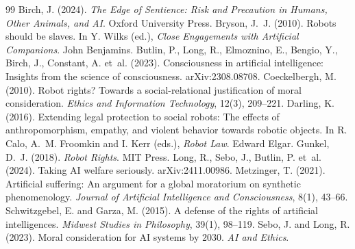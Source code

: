 \documentclass{situationist-preprint}
\begin{document}
\begin{thebibliography}{99}\small
{} Birch, J. (2024). \emph{The Edge of Sentience: Risk and Precaution in Humans, Other Animals, and AI}. Oxford University Press.
 Bryson, J.~J. (2010). Robots should be slaves. In Y. Wilks (ed.), \emph{Close Engagements with Artificial Companions}. John Benjamins.
 Butlin, P., Long, R., Elmoznino, E., Bengio, Y., Birch, J., Constant, A. et~al. (2023). Consciousness in artificial intelligence: Insights from the science of consciousness. arXiv:2308.08708.
 Coeckelbergh, M. (2010). Robot rights? Towards a social-relational justification of moral consideration. \emph{Ethics and Information Technology}, 12(3), 209--221.
 Darling, K. (2016). Extending legal protection to social robots: The effects of anthropomorphism, empathy, and violent behavior towards robotic objects. In R. Calo, A.~M. Froomkin and I. Kerr (eds.), \emph{Robot Law}. Edward Elgar.
 Gunkel, D.~J. (2018). \emph{Robot Rights}. MIT Press.
 Long, R., Sebo, J., Butlin, P. et~al. (2024). Taking AI welfare seriously. arXiv:2411.00986.
 Metzinger, T. (2021). Artificial suffering: An argument for a global moratorium on synthetic phenomenology. \emph{Journal of Artificial Intelligence and Consciousness}, 8(1), 43--66.
 Schwitzgebel, E. and Garza, M. (2015). A defense of the rights of artificial intelligences. \emph{Midwest Studies in Philosophy}, 39(1), 98--119.
 Sebo, J. and Long, R. (2023). Moral consideration for AI systems by 2030. \emph{AI and Ethics}.
\end{thebibliography}
\end{document}
